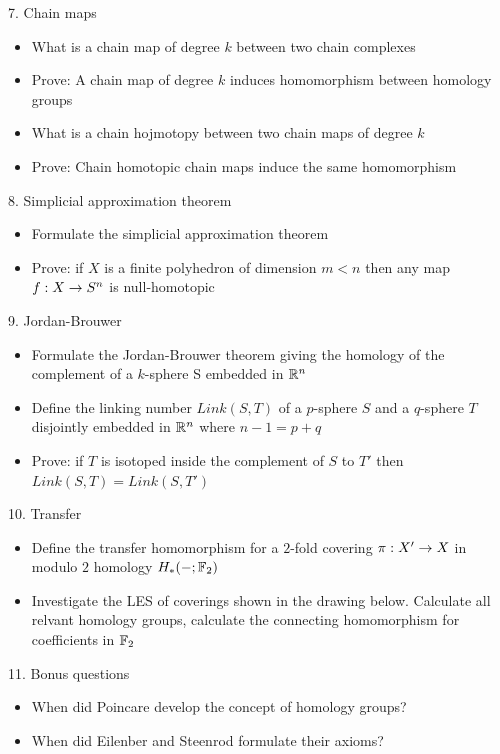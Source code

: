 7. Chain maps

\begin{itemize}
    \item What is a chain map of degree $k$ between two chain complexes
    \item Prove: A chain map of degree $k$ induces homomorphism between homology groups
    \item What is a chain hojmotopy between two chain maps of degree $k$
    \item Prove: Chain homotopic chain maps induce the same homomorphism
\end{itemize}

8. Simplicial approximation theorem

\begin{itemize}
    \item Formulate the simplicial approximation theorem
    \item Prove: if $X$ is a finite polyhedron of dimension $m <n$ then any map $f:X \rightarrow S^n$ is null-homotopic
\end{itemize}

9. Jordan-Brouwer

\begin{itemize}
    \item Formulate the Jordan-Brouwer theorem giving the homology of the complement of a $k$-sphere S embedded in $\mathbb{R}^n$
    \item Define the linking number $Link(S,T)$ of a $p$-sphere $S$ and a $q$-sphere $T$ disjointly embedded in $\mathbb{R}^n$ where $n-1 = p+q$
    \item Prove: if $T$ is isotoped inside the complement of $S$ to $T'$ then $Link(S,T)=Link(S,T')$
\end{itemize}

10. Transfer

\begin{itemize}
    \item Define the transfer homomorphism for a $2$-fold covering $\pi: X'\rightarrow X$ in modulo $2$ homology $H_*(-;\mathbb{F}_2)$
    \item Investigate the LES of coverings shown in the drawing below. Calculate all relvant homology groups, calculate the connecting homomorphism for coefficients in $\mathbb{F}_2$
\end{itemize}

11. Bonus questions

\begin{itemize}
    \item When did Poincare develop the concept of homology groups?
    \item When did Eilenber and Steenrod formulate their axioms?
\end{itemize}


